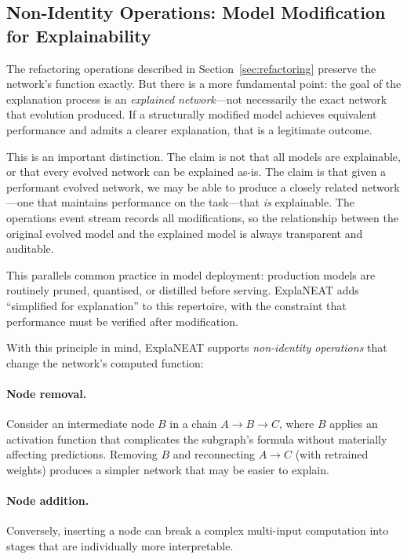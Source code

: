 \documentclass[11pt]{article}
\begin{document}
\subsection{Non-Identity Operations: Model Modification for Explainability}

The refactoring operations described in Section~\ref{sec:refactoring} preserve the network's function exactly. But there is a more fundamental point: the goal of the explanation process is an \emph{explained network}---not necessarily the exact network that evolution produced. If a structurally modified model achieves equivalent performance and admits a clearer explanation, that is a legitimate outcome.

This is an important distinction. The claim is not that all models are explainable, or that every evolved network can be explained as-is. The claim is that given a performant evolved network, we may be able to produce a closely related network---one that maintains performance on the task---that \emph{is} explainable. The operations event stream records all modifications, so the relationship between the original evolved model and the explained model is always transparent and auditable.

This parallels common practice in model deployment: production models are routinely pruned, quantised, or distilled before serving. ExplaNEAT adds ``simplified for explanation'' to this repertoire, with the constraint that performance must be verified after modification.

With this principle in mind, ExplaNEAT supports \emph{non-identity operations} that change the network's computed function:

\paragraph{Node removal.} Consider an intermediate node $B$ in a chain $A \to B \to C$, where $B$ applies an activation function that complicates the subgraph's formula without materially affecting predictions. Removing $B$ and reconnecting $A \to C$ (with retrained weights) produces a simpler network that may be easier to explain.

\paragraph{Node addition.} Conversely, inserting a node can break a complex multi-input computation into stages that are individually more interpretable.
\end{document}
